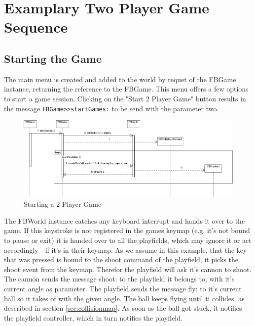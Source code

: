 \section{Examplary Two Player Game Sequence}
\subsection{Starting the Game}
The main menu is created and added to the world by requet of the FBGame instance,
returning the reference to the FBGame. This menu offers a few options to start 
a game session. Clicking on the "Start 2 Player Game" button results in the message
\lstinline!FBGame>>startGames:! to be send with the parameter two.
%
\begin{figure}[bt]
  \begin{center}
    \includegraphics[width=\linewidth]{images/Starting2PlayerGame.png}
  \end{center}
  \caption{Starting a 2 Player Game}
  \label{fig:Starting2PlayerGame}
\end{figure}
%
The FBWorld instance catches any keyboard interrupt and hands it over to the game. If
this keystroke is not registered in the games keymap (e.g. it's not bound to pause or
exit) it is handed over to all the playfields, which may ignore it or act accordingly -
if it's in their keymap. As we assume in this example, that the key that was pressed is
bound to the shoot command of the playfield, it picks the shoot event from the keymap.
Therefor the playfield will ask it's cannon to shoot. The cannon sends the message shoot:
to the playfield it belongs to, with it's current angle as parameter. The playfield
sends the message fly: to it's current ball so it takes of with the given angle.
The ball keeps flying until ti collides, as described in section \ref{sec:collisionmap}.
As soon as the ball got stuck, it notifies the playfield controller, which in turn notifies
the playfield.
%
